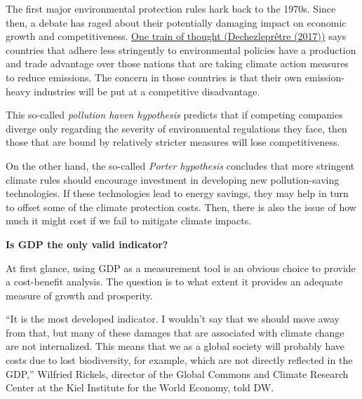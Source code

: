 \documentclass[
]{book}
\begin{document}
The first major environmental protection rules hark back to the 1970s. Since then, a debate has raged about their potentially damaging impact on economic growth and competitiveness.
\href{https://www.journals.uchicago.edu/doi/pdf/10.1093/reep/rex013}{One train of thought (Dechezleprêtre (2017))} says countries that adhere less stringently to environmental policies have a production and trade advantage over those nations that are taking climate action measures to reduce emissions. The concern in those countries is that their own emission-heavy industries will be put at a competitive disadvantage.

This so-called \emph{pollution haven hypothesis} predicts that if competing companies diverge only regarding the severity of environmental regulations they face, then those that are bound by relatively stricter
measures will lose competitiveness.

On the other hand, the so-called \emph{Porter hypothesis} concludes that more stringent climate rules should encourage investment in developing new pollution-saving technologies. If these technologies lead to energy savings, they may help in turn to offset some of the climate protection costs. Then, there is also the issue of how much it might cost if we fail to mitigate climate impacts.

\textbf{Is GDP the only valid indicator?}

At first glance, using GDP as a measurement tool is an obvious choice to provide a cost-benefit analysis. The question is to what extent it provides an adequate measure of growth and prosperity.

``It is the most developed indicator. I wouldn't say that we should move away from that, but many of these damages that are associated with climate change are not internalized. This means that we as a global society will probably have costs due to lost biodiversity, for example, which are not directly reflected in the GDP,'' Wilfried Rickels, director of the Global Commons and Climate Research Center at the Kiel Institute for the World Economy, told DW.
\end{document}

